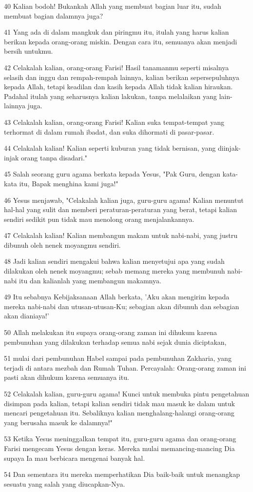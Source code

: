 \par 40 Kalian bodoh! Bukankah Allah yang membuat bagian luar itu, sudah membuat bagian dalamnya juga?
\par 41 Yang ada di dalam mangkuk dan piringmu itu, itulah yang harus kalian berikan kepada orang-orang miskin. Dengan cara itu, semuanya akan menjadi bersih untukmu.
\par 42 Celakalah kalian, orang-orang Farisi! Hasil tanamanmu seperti misalnya selasih dan inggu dan rempah-rempah lainnya, kalian berikan sepersepuluhnya kepada Allah, tetapi keadilan dan kasih kepada Allah tidak kalian hiraukan. Padahal itulah yang seharusnya kalian lakukan, tanpa melalaikan yang lain-lainnya juga.
\par 43 Celakalah kalian, orang-orang Farisi! Kalian suka tempat-tempat yang terhormat di dalam rumah ibadat, dan suka dihormati di pasar-pasar.
\par 44 Celakalah kalian! Kalian seperti kuburan yang tidak bernisan, yang diinjak-injak orang tanpa disadari."
\par 45 Salah seorang guru agama berkata kepada Yesus, "Pak Guru, dengan kata-kata itu, Bapak menghina kami juga!"
\par 46 Yesus menjawab, "Celakalah kalian juga, guru-guru agama! Kalian menuntut hal-hal yang sulit dan memberi peraturan-peraturan yang berat, tetapi kalian sendiri sedikit pun tidak mau menolong orang menjalankannya.
\par 47 Celakalah kalian! Kalian membangun makam untuk nabi-nabi, yang justru dibunuh oleh nenek moyangmu sendiri.
\par 48 Jadi kalian sendiri mengakui bahwa kalian menyetujui apa yang sudah dilakukan oleh nenek moyangmu; sebab memang mereka yang membunuh nabi-nabi itu dan kalianlah yang membangun makamnya.
\par 49 Itu sebabnya Kebijaksanaan Allah berkata, 'Aku akan mengirim kepada mereka nabi-nabi dan utusan-utusan-Ku; sebagian akan dibunuh dan sebagian akan dianiaya!'
\par 50 Allah melakukan itu supaya orang-orang zaman ini dihukum karena pembunuhan yang dilakukan terhadap semua nabi sejak dunia diciptakan,
\par 51 mulai dari pembunuhan Habel sampai pada pembunuhan Zakharia, yang terjadi di antara mezbah dan Rumah Tuhan. Percayalah: Orang-orang zaman ini pasti akan dihukum karena semuanya itu.
\par 52 Celakalah kalian, guru-guru agama! Kunci untuk membuka pintu pengetahuan disimpan pada kalian, tetapi kalian sendiri tidak mau masuk ke dalam untuk mencari pengetahuan itu. Sebaliknya kalian menghalang-halangi orang-orang yang berusaha masuk ke dalamnya!"
\par 53 Ketika Yesus meninggalkan tempat itu, guru-guru agama dan orang-orang Farisi mengecam Yesus dengan keras. Mereka mulai memancing-mancing Dia supaya Ia mau berbicara mengenai banyak hal.
\par 54 Dan sementara itu mereka memperhatikan Dia baik-baik untuk menangkap sesuatu yang salah yang diucapkan-Nya.

